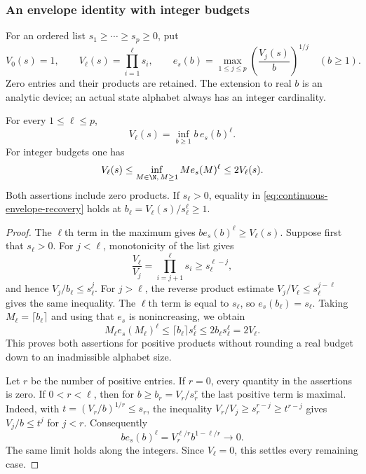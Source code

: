 \subsubsection{An envelope identity with integer budgets}
For an ordered list $s_1\ge\cdots\ge s_p\ge0$, put
\[
 V_0(s)=1,\qquad V_\ell(s)=\prod_{i=1}^{\ell}s_i,
 \qquad
 e_s(b)=\max_{1\le j\le p}\left(\frac{V_j(s)}b\right)^{1/j}
 \quad(b\ge1).
\]
Zero entries and their products are retained. The extension to real
$b$ is an analytic device; an actual state alphabet always has an
integer cardinality.

\begin{lemma}
\label{lem:integer-envelope-duality}
For every $1\le\ell\le p$,
\begin{equation}\label{eq:continuous-envelope-recovery}
 V_\ell(s)=\inf_{b\ge1}b\,e_s(b)^\ell.
\end{equation}
For integer budgets one has
\begin{equation}\label{eq:integer-envelope-recovery}
 V_\ell(s)\le
 \inf_{M\in\N,\,M\ge1}M e_s(M)^\ell
 \le2V_\ell(s).
\end{equation}
Both assertions include zero products. If $s_\ell>0$, equality in
\eqref{eq:continuous-envelope-recovery} holds at
$b_\ell=V_\ell(s)/s_\ell^\ell\ge1$.
\end{lemma}
\begin{proof}
The $\ell$th term in the maximum gives
$b e_s(b)^\ell\ge V_\ell(s)$. Suppose first that $s_\ell>0$.
For $j<\ell$, monotonicity of the list gives
\[
 \frac{V_\ell}{V_j}=\prod_{i=j+1}^{\ell}s_i
       \ge s_\ell^{\ell-j},
\]
and hence $V_j/b_\ell\le s_\ell^j$. For $j>\ell$, the reverse
product estimate $V_j/V_\ell\le s_\ell^{j-\ell}$ gives the same
inequality. The $\ell$th term is equal to $s_\ell$, so
$e_s(b_\ell)=s_\ell$. Taking $M_\ell=\lceil b_\ell\rceil$ and
using that $e_s$ is nonincreasing, we obtain
\[
 M_\ell e_s(M_\ell)^\ell
 \le\lceil b_\ell\rceil s_\ell^\ell
 \le2b_\ell s_\ell^\ell=2V_\ell.
\]
This proves both assertions for positive products without rounding a
real budget down to an inadmissible alphabet size.

Let $r$ be the number of positive entries. If $r=0$, every quantity
in the assertions is zero. If $0<r<\ell$, then for
$b\ge b_r=V_r/s_r^r$ the last positive term is maximal. Indeed,
with $t=(V_r/b)^{1/r}\le s_r$, the inequality
$V_r/V_j\ge s_r^{r-j}\ge t^{r-j}$ gives $V_j/b\le t^j$ for
$j<r$. Consequently
\[
 b e_s(b)^\ell=V_r^{\ell/r}b^{1-\ell/r}\longrightarrow0.
\]
The same limit holds along the integers. Since $V_\ell=0$, this
settles every remaining case.
\end{proof}


